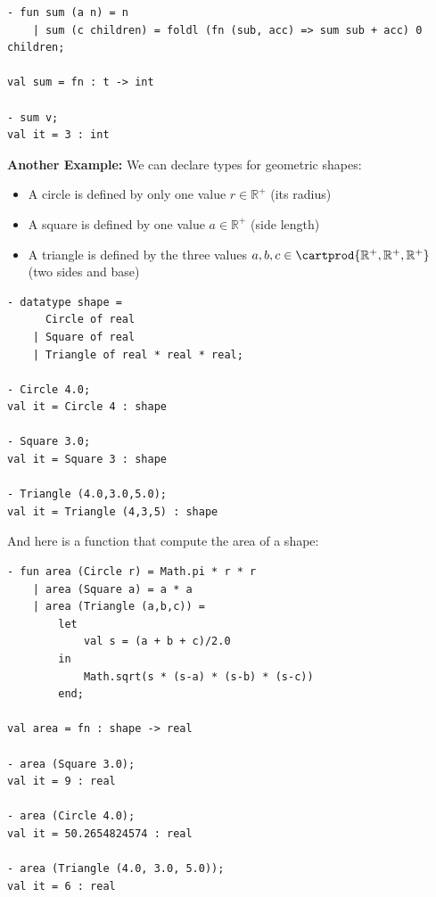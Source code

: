 \begin{verbatim}
- fun sum (a n) = n
    | sum (c children) = foldl (fn (sub, acc) => sum sub + acc) 0 children;

val sum = fn : t -> int

- sum v;
val it = 3 : int
\end{verbatim}


\textbf{Another Example:} We can declare types for geometric shapes:
\begin{itemize}
    \item A circle is defined by only one value $r \in \mathbb{R}^{+}$ (its radius)
    \item A square is defined by one value $a \in \mathbb{R}^{+}$ (side length)
    \item A triangle is defined by the three values $a,b,c \in \cartprod{\mathbb{R}^{+}, \mathbb{R}^{+}, \mathbb{R}^{+}}$ (two sides and base)
\end{itemize}

\begin{verbatim}
- datatype shape =
      Circle of real
    | Square of real
    | Triangle of real * real * real;

- Circle 4.0;
val it = Circle 4 : shape

- Square 3.0;
val it = Square 3 : shape

- Triangle (4.0,3.0,5.0);
val it = Triangle (4,3,5) : shape
\end{verbatim}
And here is a function that compute the area of a shape:
\begin{verbatim}
- fun area (Circle r) = Math.pi * r * r
    | area (Square a) = a * a
    | area (Triangle (a,b,c)) =
        let
            val s = (a + b + c)/2.0
        in
            Math.sqrt(s * (s-a) * (s-b) * (s-c))
        end;

val area = fn : shape -> real

- area (Square 3.0);
val it = 9 : real

- area (Circle 4.0);
val it = 50.2654824574 : real

- area (Triangle (4.0, 3.0, 5.0));
val it = 6 : real
\end{verbatim}

